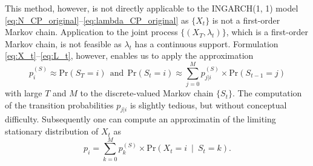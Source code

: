 \documentclass{article}
\begin{document}
This method, however, is not directly applicable to the INGARCH(1, 1) model \eqref{eq:N_CP_original}--\eqref{eq:lambda_CP_original} as $\{X_t\}$ is not a first-order Markov chain. Application to the joint process $\{(X_T, \lambda_t)\}$, which is a first-order Markov chain, is not feasible as $\lambda_t$ has a continuous support. Formulation \eqref{eq:X_t}--\eqref{eq:L_t}, however, enables us to apply the approximation
$$
p^{(S)}_i \approx \text{Pr}(S_T = i) \ \ \text{and} \ \ \text{Pr}(S_t = i) \approx \sum_{j = 0}^M p^{(S)}_{j|i} \times \text{Pr}(S_{t - 1} = j)
$$
with large $T$ and $M$ to the discrete-valued Markov chain $\{S_t\}$. The computation of the transition probabilities $p_{j|i}$ is slightly tedious, but without conceptual difficulty. Subsequently one can compute an approximatin of the limiting stationary distribution of $X_t$ as
$$
p_i = \sum_{k = 0}^M p_k^{(S)} \times \text{Pr}(X_t = i \ \mid \ S_t = k).
$$





\end{document}
